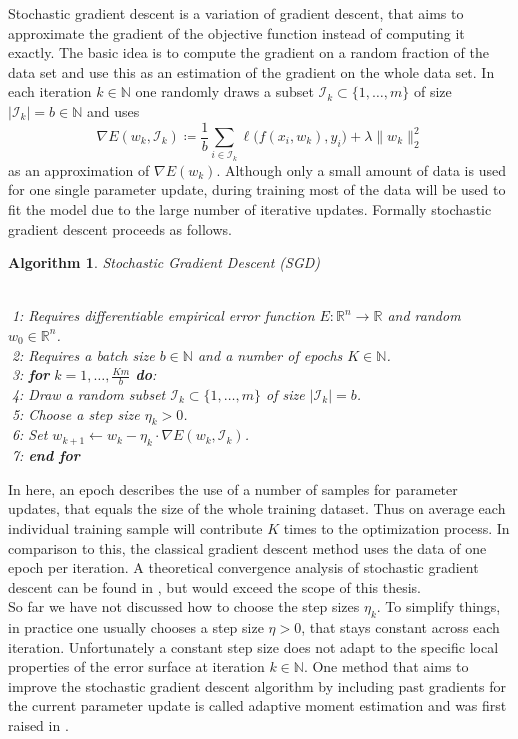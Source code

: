\documentclass[11pt, a4paper]{article}
\newtheorem{algorithm}[theorem]{Algorithm}
\newcommand{\N}{\mathbb{N}}
\newcommand{\R}{\mathbb{R}}
\newcommand{\I}{\mathcal{I}}
\begin{document}
Stochastic gradient descent is a variation of gradient descent, that aims to approximate the gradient of the objective function instead of computing it exactly. The basic idea is to compute the gradient on a random fraction of the data set and use this as an estimation of the gradient on the whole data set. In each iteration $k \in \N$ one randomly draws a subset $\I_k \subset \{ 1, \dots, m \}$ of size $| \I_k | = b \in \N$ and uses
\[ \nabla E(w_k,\I_k) \coloneq \frac{1}{b} \sum_{i \in \I_k}^{}  \ell \big ( f(x_i,w_k),y_i \big) + \lambda \big \| w_k \big \|_2^2 \]
as an approximation of $\nabla E(w_k)$. Although only a small amount of data is used for one single parameter update, during training most of the data will be used to fit the model due to the large number of iterative updates. Formally stochastic gradient descent proceeds as follows.

\begin{algorithm}
\caption{Stochastic Gradient Descent (SGD)} \ \\
\textcolor{white}{$\Big |$}1: Requires differentiable empirical error function $E: \R^n \to \R$ and random $w_0 \in \R^n$. \\
\textcolor{white}{$\Big |$}2: Requires a batch size $b \in \N$ and a number of epochs $K \in \N$. \\
\textcolor{white}{$\Big |$}3: \textbf{for} $k=1, \dots, \frac{Km}{b}$ \textbf{do}: \\
\textcolor{white}{$\Big |$}4: \quad Draw a random subset $\I_k \subset \{1, \dots, m \}$ of size $| \I_k | = b$. \\
\textcolor{white}{$\Big |$}5: \quad Choose a step size $\eta_k > 0$. \\
\textcolor{white}{$\Big |$}6: \quad Set $w_{k+1} \leftarrow w_k - \eta_k \cdot \nabla E(w_k,\I_k)$. \\
\textcolor{white}{$\Big |$}7: \textbf{end for}
\end{algorithm}

In here, an epoch describes the use of a number of samples for parameter updates, that equals the size of the whole training dataset. Thus on average each individual training sample will contribute $K$ times to the optimization process. In comparison to this, the classical gradient descent method uses the data of one epoch per iteration. A theoretical convergence analysis of stochastic gradient descent can be found in \cite{SGD}, but would exceed the scope of this thesis. \\

So far we have not discussed how to choose the step sizes $\eta_k$. To simplify things, in practice one usually chooses a step size $\eta > 0$, that stays constant across each iteration. Unfortunately a constant step size does not adapt to the specific local properties of the error surface at iteration $k \in \N$. One method that aims to improve the stochastic gradient descent algorithm by including past gradients for the current parameter update is called adaptive moment estimation and was first raised in \cite{Adam}. \\
\end{document}
